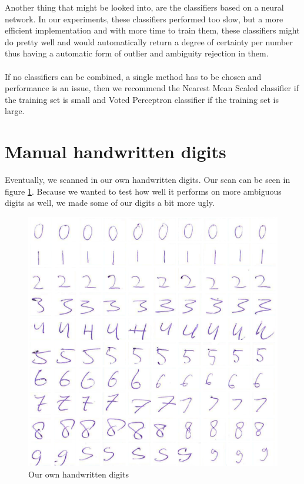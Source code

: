 \documentclass[%
        compressed,
        final,
        notitlepage,
        narroweqnarray,
        inline,
        twoside,
        ]{ieee}
\begin{document}
Another thing that might be looked into, are the classifiers based on a neural
network. In our experiments, these classifiers performed too slow, but a more
efficient implementation and with more time to train them, these classifiers
might do pretty well and would automatically return a degree of certainty per number thus having a automatic form of outlier and ambiguity rejection in them.\\\\
If no classifiers can be combined, a single method has to be chosen and
performance is an issue, then we recommend the Nearest Mean Scaled classifier if
the training set is small and Voted Perceptron classifier if the training set is
large.

\appendix

\section{Manual handwritten digits}
Eventually, we scanned in our own handwritten digits. Our scan can be seen in figure
\ref{fig:handwritten}. Because we wanted to test how well it performs on
more ambiguous digits as well, we made some of our digits a bit more ugly.

\begin{figure}
    \includegraphics[width=\columnwidth]{images/handwritten.png}
    \caption{Our own handwritten digits}
    \label{fig:handwritten}
\end{figure}
\end{document}

